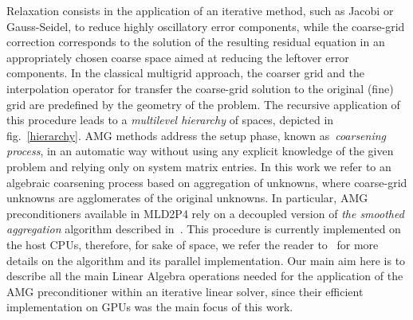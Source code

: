 Relaxation consists in the application of an iterative method, such as
Jacobi or Gauss-Seidel, to reduce highly oscillatory error components,
while the coarse-grid correction corresponds to the solution of the
resulting residual equation in an appropriately chosen coarse space
aimed at reducing the leftover error components. In the classical
multigrid approach, the coarser grid and the interpolation operator
for transfer the coarse-grid solution to the original (fine) grid are
predefined by the geometry of the problem. The recursive application
of this procedure leads to a \emph{multilevel hierarchy} of spaces,
depicted in fig.~\ref{hierarchy}. AMG
methods address the setup phase, known as~\emph{coarsening process},
in an automatic way without using any explicit knowledge of the given
problem and relying only on system matrix entries. In this work we
refer to an algebraic coarsening process based on aggregation of
unknowns, where coarse-grid unknowns are agglomerates of the original
unknowns. In particular, AMG preconditioners available in MLD2P4 rely
on a decoupled version of \emph{the smoothed aggregation} algorithm
described in~\cite{BrezinaVanek96,BrezinaVanek99}. This procedure is
currently implemented on the host CPUs, therefore, for sake of space,
we refer the reader to~\cite{mld2p4-2-guide} for more details on the
algorithm and its parallel implementation. 
Our main aim here is to describe all the main Linear Algebra
operations needed for the application of the AMG preconditioner within
an iterative  linear solver, since their efficient implementation on
GPUs was the main focus of this work. 

